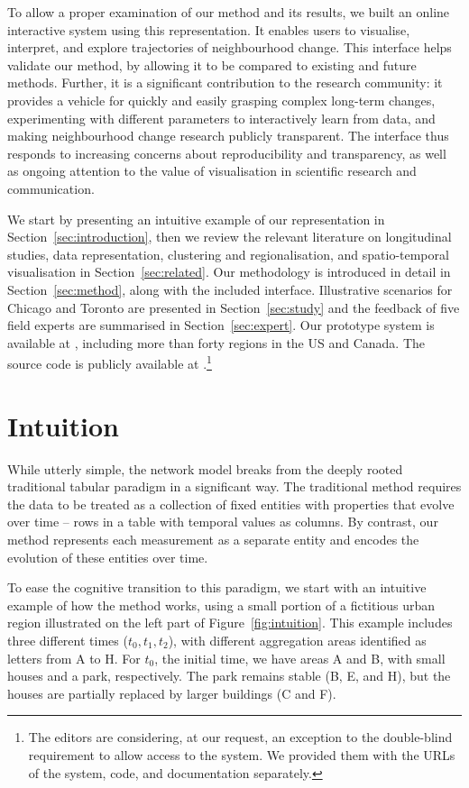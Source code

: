 To allow a proper examination of our method and its results, we built an online
interactive system using this representation. It enables users to visualise,
interpret, and explore trajectories of neighbourhood change. This interface
helps validate our method, by allowing it to be compared to existing and future
methods. Further, it is a significant contribution to the research community: it
provides a vehicle for quickly and easily grasping complex long-term changes,
experimenting with different parameters to interactively learn from data, and
making neighbourhood change research publicly transparent. The interface thus
responds to increasing concerns about reproducibility and transparency, as well
as ongoing attention to the value of visualisation in scientific research and
communication.


We start by presenting an intuitive example of our representation in
Section~\ref{sec:introduction}, then we review the relevant literature on
longitudinal studies, data representation, clustering and regionalisation, and
spatio-temporal visualisation in Section~\ref{sec:related}. Our methodology is
introduced in detail in Section~\ref{sec:method}, along with the included
interface. Illustrative scenarios for Chicago and Toronto are presented in
Section~\ref{sec:study} and the feedback of five field experts are summarised in
Section~\ref{sec:expert}. Our prototype system is available at
, including more than forty regions in the
US and Canada. The source code is publicly available at
.\footnote{The editors are
considering, at our request, an exception to the double-blind requirement to
allow access to the system. We provided them with the URLs of the system, code,
and documentation separately.}


\section{Intuition}
\label{sec:intuition}
While utterly simple, the network model breaks from the deeply rooted
traditional tabular paradigm in a significant way. The traditional method
requires the data to be treated as a collection of fixed entities with
properties that evolve over time -- rows in a table with temporal values as
columns. By contrast, our method represents each measurement as a separate
entity and encodes the evolution of these entities over time.

To ease the cognitive transition to this paradigm, we start with an intuitive
example of how the method works, using a small portion of a fictitious urban
region illustrated on the left part of Figure~\ref{fig:intuition}. This example
includes three different times ($t_0,t_1,t_2$), with different aggregation areas
identified as letters from A to H. For $t_0$, the initial time, we have areas A
and B, with small houses and a park, respectively. The park remains stable (B,
E, and H), but the houses are partially replaced by larger buildings (C and F). 

